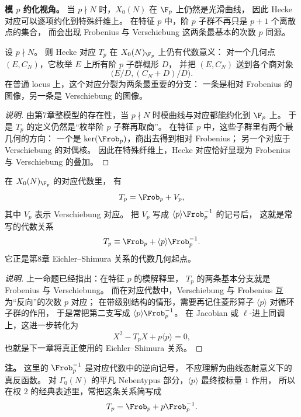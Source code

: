 \textbf{模 $p$ 约化视角。}
当 $p\nmid N$ 时，$X_0(N)$ 在 $\F_p$ 上仍然是光滑曲线，
因此 Hecke 对应可以逐项约化到特殊纤维上。
在特征 $p$ 中，阶 $p$ 子群不再只是 $p+1$ 个离散点的集合，
而会出现 Frobenius 与 Verschiebung 这两条最基本的次数 $p$ 同源。

\begin{proposition}[特殊纤维上的 $T_p$]
\label{prop:hecke-correspondence-mod-p}
设 $p\nmid N$。
则 Hecke 对应 $T_p$ 在 $X_0(N)_{\F_p}$ 上仍有代数意义：
对一个几何点 $(E,C_N)$，它枚举 $E$ 上所有阶 $p$ 子群概形 $D$，
并把 $(E,C_N)$ 送到各个商对象
\[
  \bigl(E/D,(C_N+D)/D\bigr).
\]
在普通 locus 上，这个对应分裂为两条最重要的分支：
一条是相对 Frobenius 的图像，另一条是 Verschiebung 的图像。
\end{proposition}

\begin{proof}[说明]
由第7章整模型的存在性，当 $p\nmid N$ 时模曲线与对应都能约化到 $\F_p$ 上。
于是 $T_p$ 的定义仍然是“枚举阶 $p$ 子群再取商”。
在特征 $p$ 中，这些子群里有两个最几何的方向：
一个是 $\ker(\Frob_p)$，商出去得到相对 Frobenius；
另一个对应于 Verschiebung 的对偶核。
因此在特殊纤维上，Hecke 对应恰好显现为 Frobenius 与 Verschiebung 的叠加。
\end{proof}

\begin{corollary}
\label{cor:algebraic-eichler-shimura-correspondence}
在 $X_0(N)_{\F_p}$ 的对应代数里，
有
\[
  T_p=\Frob_p+V_p,
\]
其中 $V_p$ 表示 Verschiebung 对应。
把 $V_p$ 写成 $\langle p\rangle\Frob_p^{-1}$ 的记号后，
这就是常写的代数关系
\[
  T_p\equiv \Frob_p+\langle p\rangle\Frob_p^{-1}.
\]
它正是第8章 Eichler--Shimura 关系的代数几何起点。
\end{corollary}

\begin{proof}[说明]
上一命题已经指出：在特征 $p$ 的模解释里，
$T_p$ 的两条基本分支就是 Frobenius 与 Verschiebung。
而在对应代数中，Verschiebung 与 Frobenius 互为“反向”的次数 $p$ 对应；
在带级别结构的情形，需要再记住菱形算子 $\langle p\rangle$ 对循环子群的作用，
于是常把第二支写成 $\langle p\rangle\Frob_p^{-1}$。
在 Jacobian 或 $\ell$-进上同调上，这进一步转化为
\[
  X^2-T_pX+p\langle p\rangle=0,
\]
也就是下一章将真正使用的 Eichler--Shimura 关系。
\end{proof}

\textbf{注。}
这里的 $\Frob_p^{-1}$ 是对应代数中的逆向记号，
不应理解为曲线态射意义下的真反函数。
对 $\Gamma_0(N)$ 的平凡 Nebentypus 部分，$\langle p\rangle$ 最终按标量 $1$ 作用，
所以在权 $2$ 的经典表述里，常把这条关系简写成
\[
  T_p=\Frob_p+p\Frob_p^{-1}.
\]

